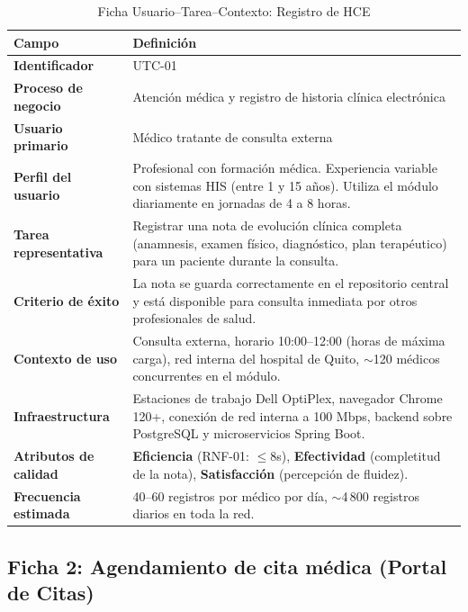 \documentclass[12pt,a4paper]{article}
\begin{document}
\begin{table}[H]
\centering
\caption{Ficha Usuario--Tarea--Contexto: Registro de HCE}
\begin{tabularx}{\textwidth}{l X}
\toprule
\textbf{Campo} & \textbf{Definici\'on} \\
\midrule
\textbf{Identificador} & UTC-01 \\
\textbf{Proceso de negocio} & Atenci\'on m\'edica y registro de historia cl\'inica electr\'onica \\
\textbf{Usuario primario} & M\'edico tratante de consulta externa \\
\textbf{Perfil del usuario} & Profesional con formaci\'on m\'edica. Experiencia variable con sistemas HIS (entre 1 y 15 a\~nos). Utiliza el m\'odulo diariamente en jornadas de 4 a 8 horas. \\
\textbf{Tarea representativa} & Registrar una nota de evoluci\'on cl\'inica completa (anamnesis, examen f\'isico, diagn\'ostico, plan terap\'eutico) para un paciente durante la consulta. \\
\textbf{Criterio de \'exito} & La nota se guarda correctamente en el repositorio central y est\'a disponible para consulta inmediata por otros profesionales de salud. \\
\textbf{Contexto de uso} & Consulta externa, horario 10:00--12:00 (horas de m\'axima carga), red interna del hospital de Quito, $\sim$120 m\'edicos concurrentes en el m\'odulo. \\
\textbf{Infraestructura} & Estaciones de trabajo Dell OptiPlex, navegador Chrome 120+, conexi\'on de red interna a 100 Mbps, backend sobre PostgreSQL y microservicios Spring Boot. \\
\textbf{Atributos de calidad} & \textbf{Eficiencia} (RNF-01: $\le 8$s), \textbf{Efectividad} (completitud de la nota), \textbf{Satisfacci\'on} (percepci\'on de fluidez). \\
\textbf{Frecuencia estimada} & 40--60 registros por m\'edico por d\'ia, $\sim$4\,800 registros diarios en toda la red. \\
\bottomrule
\end{tabularx}
\end{table}

\subsection{Ficha 2: Agendamiento de cita m\'edica (Portal de Citas)}
\end{document}
